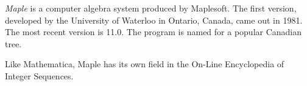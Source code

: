 \documentclass[12pt]{article}
\begin{document}
{\em Maple} is a computer algebra system produced by Maplesoft. The first version, developed by the University of Waterloo in Ontario, Canada, came out in 1981. The most recent version is 11.0. The program is named for a popular Canadian tree.

Like Mathematica, Maple has its own field in the On-Line Encyclopedia of Integer Sequences. 

\end{document}
